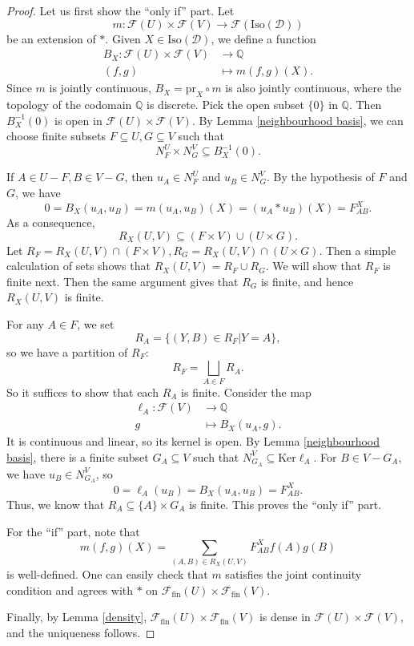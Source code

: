 \documentclass[a4paper,12pt]{amsart}
\numberwithin{equation}{section}
\newcommand{\Ker}{\mathrm{Ker}}
\newcommand{\Iso}{\mathrm{Iso}}
\newcommand{\1}{\mathbf{1}}
\newcommand{\fin}{\mathrm{fin}}
\newcommand{\pr}{\mathrm{pr}}
\begin{document}
\begin{proof}
    Let us first show the ``only if'' part. Let
    \[m:\mathscr{F}(U)\times\mathscr{F}(V)\rightarrow\mathscr{F}(\Iso(\mathcal{D}))\]
    be an extension of $*$. Given $X\in\Iso(\mathcal{D})$, we define a function
    \begin{align*}
        B_X:\mathscr{F}(U)\times\mathscr{F}(V)&\rightarrow\mathbb{Q}\\
        (f,g)&\mapsto m(f,g)(X).
    \end{align*}
    Since $m$ is jointly continuous, $B_X=\pr_X\circ m$ is also jointly continuous, where the topology of the codomain $\mathbb{Q}$ is discrete. Pick the open subset $\{0\}$ in $\mathbb{Q}$. Then $B_X^{-1}(0)$ is open in $\mathscr{F}(U)\times\mathscr{F}(V)$. By Lemma \ref{neighbourhood basis}, we can choose finite subsets $F\subseteq U,G\subseteq V$ such that
    \[N_F^U\times N_G^V\subseteq B_X^{-1}(0).\]

    If $A\in U-F,B\in V-G$, then $u_A\in N_F^U$ and $u_B\in N_G^V$. By the hypothesis of $F$ and $G$, we have
    \[0=B_X(u_A,u_B)=m(u_A,u_B)(X)=(u_A*u_B)(X)=F_{AB}^X.\]
    As a consequence,
    \[R_X(U,V)\subseteq(F\times V)\cup (U\times G).\]
    Let $R_F=R_X(U,V)\cap(F\times V), R_G=R_X(U,V)\cap(U\times G)$. Then a simple calculation of sets shows that $R_X(U,V)=R_F\cup R_G$. We will show that $R_F$ is finite next. Then the same argument gives that $R_G$ is finite, and hence $R_X(U,V)$ is finite.

    For any $A\in F$, we set
    \[R_A=\{(Y,B)\in R_F|Y=A\},\]
    so we have a partition of $R_F$:
    \[R_F=\bigsqcup_{A\in F}R_A.\]
    So it suffices to show that each $R_A$ is finite. Consider the map
    \begin{align*}
        \ell_A:\mathscr{F}(V)&\rightarrow\mathbb{Q}\\
        g&\mapsto B_X(u_A,g).
    \end{align*}
    It is continuous and linear, so its kernel is open. By Lemma \ref{neighbourhood basis}, there is a finite subset $G_A\subseteq V$ such that $N_{G_A}^V\subseteq\Ker\ell_A$. For $B\in V-G_A$, we have $u_B\in N_{G_A}^V$, so
    \[0=\ell_A(u_B)=B_X(u_A,u_B)=F_{AB}^X.\]
    Thus, we know that $R_A\subseteq \{A\}\times G_A$ is finite. This proves the ``only if'' part.

    For the ``if'' part, note that
    \[m(f,g)(X)=\sum_{(A,B)\in R_X(U,V)}F_{AB}^Xf(A)g(B)\]
    is well-defined. One can easily check that $m$ satisfies the joint continuity condition and agrees with $*$ on $\mathscr{F}_{\fin}(U)\times\mathscr{F}_{\fin}(V)$.

    Finally, by Lemma \ref{density}, $\mathscr{F}_{\fin}(U)\times\mathscr{F}_{\fin}(V)$ is dense in $\mathscr{F}(U)\times\mathscr{F}(V)$, and the uniqueness follows.
\end{proof}
\end{document}
